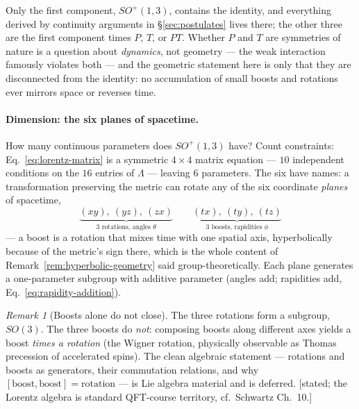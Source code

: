 \documentclass[11pt]{article}
\theoremstyle{plain}
\theoremstyle{definition}
\theoremstyle{remark}
\newtheorem{remark}[theorem]{Remark}
\begin{document}
Only the first component, $SO^+(1,3)$, contains the identity, and
everything derived by continuity arguments in
\S\ref{sec:postulates} lives there; the other three are the first
component times $P$, $T$, or $PT$. Whether $P$ and $T$ are symmetries
of nature is a question about \emph{dynamics}, not geometry --- the
weak interaction famously violates both --- and the geometric statement
here is only that they are disconnected from the identity: no
accumulation of small boosts and rotations ever mirrors space or
reverses time.

\paragraph{Dimension: the six planes of spacetime.} How many
continuous parameters does $SO^+(1,3)$ have? Count constraints:
Eq.~\eqref{eq:lorentz-matrix} is a symmetric $4\times4$ matrix
equation --- $10$ independent conditions on the $16$ entries of
$\mathsf\Lambda$ --- leaving $\boxed{6}$ parameters. The six have
names: a transformation preserving the metric can rotate any of the
six coordinate \emph{planes} of spacetime,
\begin{equation}
  \underbrace{(xy),\ (yz),\ (zx)}_{\text{3 rotations, angles }\theta}
  \qquad
  \underbrace{(tx),\ (ty),\ (tz)}_{\text{3 boosts, rapidities }\phi}
\end{equation}
--- a boost is a rotation that mixes time with one spatial axis,
hyperbolically because of the metric's sign there, which is the whole
content of Remark~\ref{rem:hyperbolic-geometry} said group-theoretically.
Each plane generates a one-parameter subgroup with additive parameter
(angles add; rapidities add, Eq.~\eqref{eq:rapidity-addition}).

\begin{remark}[Boosts alone do not close]\label{rem:wigner}
The three rotations form a subgroup, $SO(3)$. The three boosts do
\emph{not}: composing boosts along different axes yields a boost
\emph{times a rotation} (the Wigner rotation, physically observable as
Thomas precession of accelerated spins). The clean algebraic statement
--- rotations and boosts as generators, their commutation relations,
and why $[\text{boost}, \text{boost}] = \text{rotation}$ --- is Lie
algebra material and is deferred. [stated; the Lorentz algebra is
standard QFT-course territory, cf.\ Schwartz Ch.\ 10.]
\end{remark}
\end{document}
